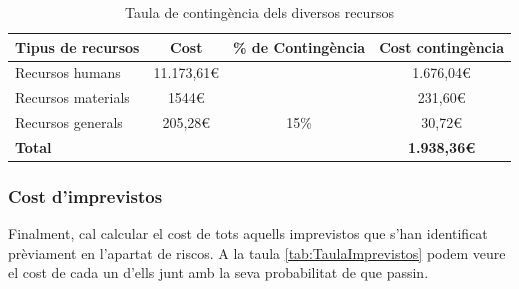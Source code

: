 \documentclass[a4paper]{article}
\begin{document}
\begin{table}[H]
    \begin{center}
        \begin{tabular}{|l|c|c|c|}
            \hline
            \rowcolor[HTML]{9B9B9B} 
            {\color[HTML]{000000} \textbf{Tipus de recursos}} & {\color[HTML]{000000} \textbf{Cost}} & {\color[HTML]{000000} \textbf{\% de Contingència}} & {\color[HTML]{000000} \textbf{Cost contingència}} \\ \hline
            {\color[HTML]{000000} Recursos humans}            & {\color[HTML]{000000} 11.173,61€}    & {\color[HTML]{000000} }                            & {\color[HTML]{000000} 1.676,04€}                  \\ \cline{1-2} \cline{4-4} 
            {\color[HTML]{000000} Recursos materials}         & {\color[HTML]{000000} 1544€}          & {\color[HTML]{000000} }                            & {\color[HTML]{000000} 231,60€}                    \\ \cline{1-2} \cline{4-4} 
            {\color[HTML]{000000} Recursos generals}          & {\color[HTML]{000000} 205,28€}       & \multirow{-3}{*}{{\color[HTML]{000000} 15\%}}      & {\color[HTML]{000000} 30,72€}                     \\ \hline
            \rowcolor[HTML]{C0C0C0} 
            {\color[HTML]{000000} \textbf{Total}}             & {\color[HTML]{000000} \textbf{}}     & {\color[HTML]{000000} \textbf{}}                   & {\color[HTML]{000000} \textbf{1.938,36€}}         \\ \hline
        \end{tabular}
        \caption{Taula de contingència dels diversos recursos}
        \label{tab:TaulaContingència}
    \end{center}
\end{table}

\subsubsection{Cost d'imprevistos}
Finalment, cal calcular el cost de tots aquells imprevistos que s'han identificat prèviament en l'apartat de riscos. A la taula \ref{tab:TaulaImprevistos} podem veure el cost de cada un d'ells junt amb la seva probabilitat de que passin.
\end{document}
